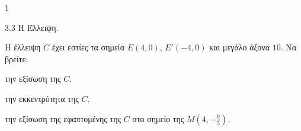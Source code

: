 \begin{ylh}{1}
    \item 3.3 Η Έλλειψη.
\end{ylh}
Η έλλειψη $C$ έχει εστίες τα σημεία $E(4,0)$, $E'(-4,0)$ και μεγάλο άξονα $10$. Να βρείτε:
\begin{alist}
    \item την εξίσωση της $C$. 
    \item την εκκεντρότητα της $C$. 
    \item την εξίσωση της εφαπτομένης της $C$ στο σημείο της $M(4, -\frac{9}{5})$. 
\end{alist}
